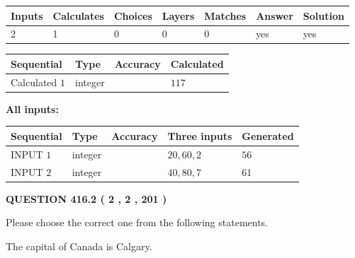 \documentclass[12pt]{article}
\begin{document}
 

 
   
   
   
   
\noindent\begin{tabular}{|l|l|l|l|l|l|l|}
 \hline
Inputs & Calculates & Choices & Layers & Matches & Answer & Solution \\ \hline
 2  & 
 1  & 
 0
  & 
 0  & 
 0  & 
  yes & 
  yes 
  \\ \hline
 \end{tabular}
   
   
   
   
\noindent{}
   
   
  
  
\noindent\begin{tabular}{|l|l|l|l|}
\hline
 Sequential & Type & Accuracy & Calculated \\ 
\hline
 
 
  Calculated $  1 $ & integer &  & 
  $ 117 $ 
 \\  \hline  
 \end{tabular}
   
   
   
   
\noindent\vspace{0.1in}\hspace{-0.08in} {\textbf{\Large{All inputs: }}}
   
   
  
  
\noindent\begin{tabular}{|l|l|l|l|l|}
\hline
 Sequential & Type & Accuracy & Three inputs & Generated \\ 
\hline
 
 
  INPUT $  1 $ & integer &  & $
 20
 , 
 60
 , 
 2
 $ & $ 56 $ 
 \\  \hline  
 
 
  INPUT $  2 $ & integer &  & $
 40
 , 
 80
 , 
 7
 $ & $ 61 $ 
 \\  \hline  
 \end{tabular}
   
   
  
\vspace{0.2in}
  
{\textbf{\Large{QUESTION
416.2 
 ( 2 , 2 , 201 )
}}}
  
  
Please choose the correct one from the following statements.
 
 
The capital of Canada is Calgary.
 
\end{document}
